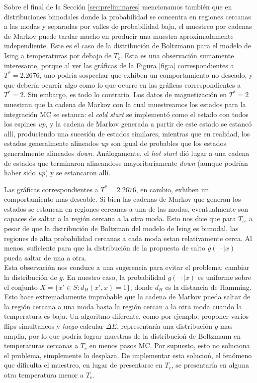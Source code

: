 \documentclass[a4paper,12pt]{article}
\begin{document}
Sobre el final de la Sección \ref{sec:preliminares} mencionamos también que en distribuciones bimodales donde la probabilidad se concentra en regiones cercanas a las modas y separadas por valles de probabilidad baja, el muestreo por cadenas de Markov puede tardar mucho en producir una muestra aproximadamente independiente. Este es el caso de la distribución de Boltzmann para el modelo de Ising a temperaturas por debajo de $T_c$. Esta es una observación sumamente interesante, porque al ver las gráficas de la Figura \ref{fig:a} correspondientes a $T^* = 2.2676$, uno podría sospechar que exhiben un comportamiento no deseado, y que debería ocurrir algo como lo que ocurre en las gráficas correspondientes a $T^* = 2$. Sin embargo, es todo lo contrario. Los datos de magnetización en $T^*= 2$ muestran que la cadena de Markov con la cual muestreamos los estados para la integración MC se estanca: el {\it cold start} se implementó como el estado con todos los espines {\it up}, y la cadena de Markov generada a partir de este estado se estancó allí, produciendo una sucesión de estados similares, mientras que en realidad, los estados generalmente alineados {\it up} son igual de probables que los estados generalmente alineados {\it down}. Análogamente, el {\it hot start} dió lugar a una cadena de estados que terminaron alineandose mayoritariamente {\it down} (aunque podrían haber sido {\it up}) y se estancaron allí.

Las gráficas correspondientes a $T^* = 2.2676$, en cambio, exhiben un comportamiento mas deseable. Si bien las cadenas de Markov que generan los estados se estancan en regiones cercanas a una de las modas, eventualmente son capaces de saltar a la región cercana a la otra moda. Esto nos dice que para $T_c$, a pesar de que la distribución de Boltzman del modelo de Ising es bimodal, las regiones de alta probabilidad cercanas a cada moda estan relativamente cerca. Al menos, suficiente para que la distribución de la propuesta de salto $g(\; \cdot \mid x)$ pueda saltar de una a otra.\\

Esta observación nos conduce a una sugerencia para evitar el problema: cambiar la distribución de $g$. En nuestro caso, la probabilidad $g(\; \cdot \mid x)$ es uniforme sobre el conjunto $X = \{x' \in S : d_H(x', x) = 1 \}$, donde $d_H$ es la distancia de Hamming. Esto hace extremadamente improbable que la cadena de Markov pueda saltar de la región cercana a una moda hasta la región cercan a la otra moda cuando la temperatura es baja. Un algoritmo diferente, como por ejemplo, proponer varios flips simultaneos y {\it luego} calcular $\Delta E$, representaría una distribución $g$ mas amplia, por lo que podría lograr muestras de la distribucioń de Boltzmann en temperaturas cercanas a $T_c$ en menos pasos MC. Por supuesto, esto no soluciona el problema, simplemente lo desplaza. De implementar esta solucioń, el fenómeno que dificulta el muestreo, en lugar de presentarse en $T_c$, se presentaría en alguna otra temperatura menor a $T_c$.
\end{document}
